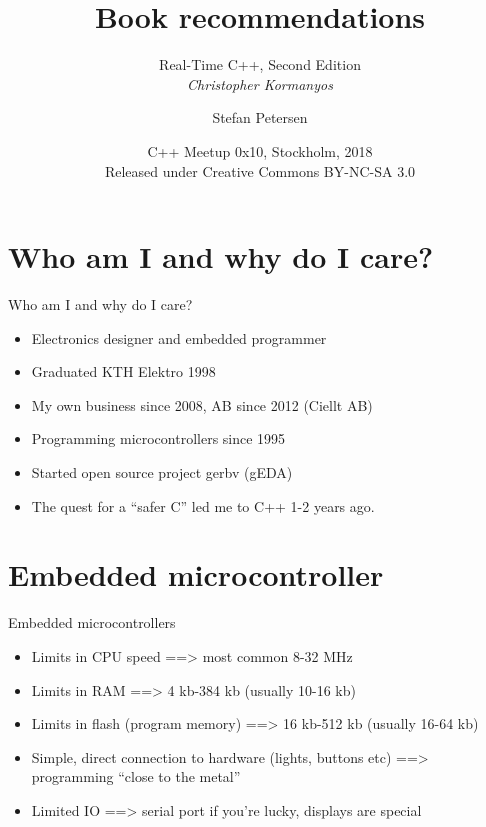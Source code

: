 \documentclass{beamer}
\title{Book recommendations }
\subtitle{Real-Time C++, Second Edition \\ \emph{Christopher Kormanyos}}
\author{Stefan Petersen}
\date[2018-10-25]{C++ Meetup 0x10, Stockholm, 2018 \\
  Released under Creative Commons BY-NC-SA 3.0 \\
  \cc \byncsa}
\begin{document}
\begin{frame}
  \titlepage
\end{frame}
\section{Who am I and why do I care?}
\begin{frame}{Who am I and why do I care?}
  \begin{itemize}
  \item Electronics designer and embedded programmer
  \item Graduated KTH Elektro 1998
  \item My own business since 2008, AB since 2012 (Ciellt AB)
  \item Programming microcontrollers since 1995
  \item Started open source project gerbv (gEDA)
  \item The quest for a ``safer C'' led me to C++ 1-2 years ago.
  \end{itemize}
\end{frame}

\section{Embedded microcontroller}

\begin{frame}{Embedded microcontrollers}
  \begin{itemize}
  \item  Limits in CPU speed
    \pause ==> most common 8-32 MHz
    \pause \item Limits in RAM
    \pause ==> 4 kb-384 kb (usually 10-16 kb)
    \pause \item Limits in flash (program memory)
    \pause ==> 16 kb-512 kb (usually 16-64 kb)
    \pause \item Simple, direct connection to hardware (lights, buttons etc)
    \pause ==> programming ``close to the metal''
    \pause \item Limited IO
    \pause ==> serial port if you're lucky, displays are special
  \end{itemize}
\end{frame}
\end{document}
